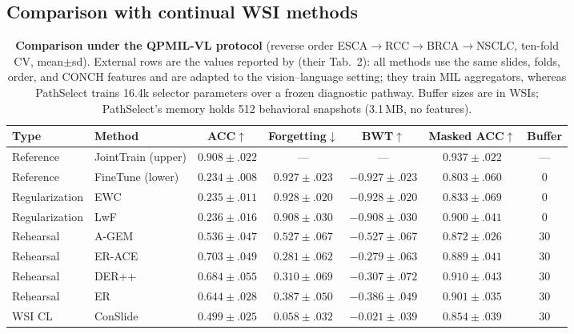 \documentclass{article}
\begin{document}
\subsection{Comparison with continual WSI methods}
\label{ssec:sota}

\begin{table}[t]
\centering\footnotesize
\caption{\textbf{Comparison under the QPMIL-VL protocol} (reverse order ESCA$\rightarrow$RCC$\rightarrow$BRCA$\rightarrow$NSCLC, ten-fold CV, mean$\pm$sd). External rows are the values reported by \cite{gou2025qpmil} (their Tab.~2): all methods use the same slides, folds, order, and CONCH features and are adapted to the vision--language setting; they train MIL aggregators, whereas PathSelect trains 16.4k selector parameters over a frozen diagnostic pathway. Buffer sizes are in WSIs; PathSelect's memory holds 512 behavioral snapshots (3.1\,MB, no features).}
\label{tab:sota}
\begin{tabular}{llccccc}
\toprule
Type & Method & ACC$\uparrow$ & Forgetting$\downarrow$ & BWT$\uparrow$ & Masked ACC$\uparrow$ & Buffer \\
\midrule
Reference & JointTrain (upper) & $0.908{\pm}.022$ & --- & --- & $0.937{\pm}.022$ & --- \\
Reference & FineTune (lower) & $0.234{\pm}.008$ & $0.927{\pm}.023$ & $-0.927{\pm}.023$ & $0.803{\pm}.060$ & 0 \\
Regularization & EWC \cite{kirkpatrick2017ewc} & $0.235{\pm}.011$ & $0.928{\pm}.020$ & $-0.928{\pm}.020$ & $0.833{\pm}.069$ & 0 \\
Regularization & LwF \cite{li2017lwf} & $0.236{\pm}.016$ & $0.908{\pm}.030$ & $-0.908{\pm}.030$ & $0.900{\pm}.041$ & 0 \\
Rehearsal & A-GEM \cite{chaudhry2019agem} & $0.536{\pm}.047$ & $0.527{\pm}.067$ & $-0.527{\pm}.067$ & $0.872{\pm}.026$ & 30 \\
Rehearsal & ER-ACE \cite{caccia2022erace} & $0.703{\pm}.049$ & $0.281{\pm}.062$ & $-0.279{\pm}.063$ & $0.889{\pm}.041$ & 30 \\
Rehearsal & DER++ \cite{buzzega2020derpp} & $0.684{\pm}.055$ & $0.310{\pm}.069$ & $-0.307{\pm}.072$ & $0.910{\pm}.043$ & 30 \\
Rehearsal & ER \cite{chaudhry2019er} & $0.644{\pm}.028$ & $0.387{\pm}.050$ & $-0.386{\pm}.049$ & $0.901{\pm}.035$ & 30 \\
WSI CL & ConSlide \cite{huang2023conslide} & $0.499{\pm}.025$ & $0.058{\pm}.032$ & $-0.021{\pm}.039$ & $0.854{\pm}.039$ & 30 \\

\end{tabular}
\end{table}
\end{document}
